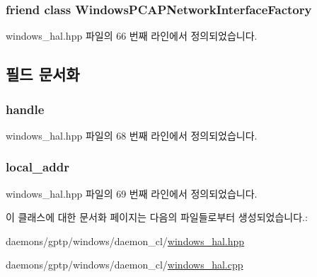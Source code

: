\subsubsection[{\texorpdfstring{Windows\+P\+C\+A\+P\+Network\+Interface\+Factory}{WindowsPCAPNetworkInterfaceFactory}}]{\setlength{\rightskip}{0pt plus 5cm}friend class {\bf Windows\+P\+C\+A\+P\+Network\+Interface\+Factory}\hspace{0.3cm}{\ttfamily [friend]}}\hypertarget{class_windows_p_c_a_p_network_interface_af9a4356027aac1b398ffd7c7f60398bc}{}\label{class_windows_p_c_a_p_network_interface_af9a4356027aac1b398ffd7c7f60398bc}


windows\+\_\+hal.\+hpp 파일의 66 번째 라인에서 정의되었습니다.



\subsection{필드 문서화}
\subsubsection[{\texorpdfstring{handle}{handle}}]{ handle\hspace{0.3cm}{\ttfamily [private]}}\hypertarget{class_windows_p_c_a_p_network_interface_af365a053e5f8823efe7e4ed6a209cd8e}{}\label{class_windows_p_c_a_p_network_interface_af365a053e5f8823efe7e4ed6a209cd8e}


windows\+\_\+hal.\+hpp 파일의 68 번째 라인에서 정의되었습니다.

\subsubsection[{\texorpdfstring{local\+\_\+addr}{local_addr}}]{ local\+\_\+addr\hspace{0.3cm}{\ttfamily [private]}}\hypertarget{class_windows_p_c_a_p_network_interface_af3d1546f688fbb9cec0317d152cab1da}{}\label{class_windows_p_c_a_p_network_interface_af3d1546f688fbb9cec0317d152cab1da}


windows\+\_\+hal.\+hpp 파일의 69 번째 라인에서 정의되었습니다.



이 클래스에 대한 문서화 페이지는 다음의 파일들로부터 생성되었습니다.\+:\begin{DoxyCompactItemize}
\item 
daemons/gptp/windows/daemon\+\_\+cl/\hyperlink{windows__hal_8hpp}{windows\+\_\+hal.\+hpp}\item 
daemons/gptp/windows/daemon\+\_\+cl/\hyperlink{windows__hal_8cpp}{windows\+\_\+hal.\+cpp}\end{DoxyCompactItemize}
